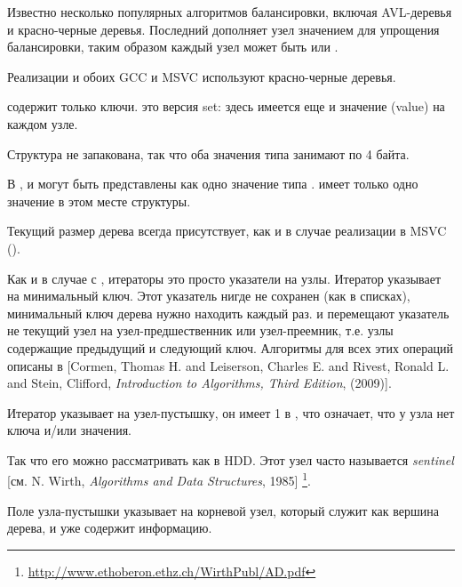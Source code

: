 Известно несколько популярных алгоритмов балансировки, включая AVL-деревья и красно-черные деревья.
Последний дополняет узел значением  для упрощения балансировки, таким образом каждый узел может быть
 или .

Реализации  и  обоих GCC и MSVC используют красно-черные деревья.

 содержит только ключи.
 это  версия set: здесь имеется еще и значение (value) на каждом узле.






Структура не запакована, так что оба значения типа \Tchar занимают по 4 байта.

В ,  и  могут быть представлены как одно значение типа .
 имеет только одно значение в этом месте структуры.

Текущий размер дерева всегда присутствует, как и в случае реализации  в MSVC ().

Как и в случае с , итераторы это просто указатели на узлы.
Итератор  указывает на минимальный ключ.
Этот указатель нигде не сохранен (как в списках), минимальный ключ дерева нужно находить каждый раз.
 и  перемещают указатель не текущий узел на узел-предшественник
или узел-преемник, т.е. узлы содержащие предыдущий и следующий ключ.
Алгоритмы для всех этих операций описаны в
[Cormen, Thomas H. and Leiserson, Charles E. and Rivest, Ronald L. and Stein, Clifford,
\emph{Introduction to Algorithms, Third Edition}, (2009)].

Итератор  указывает на узел-пустышку, он имеет 1 в , что означает, что у узла
нет ключа и/или значения.

Так что его можно рассматривать как  в \ac{HDD}.
Этот узел часто называется \emph{sentinel} [см. N. Wirth, \emph{Algorithms and Data Structures}, 1985]
\footnote{\url{http://www.ethoberon.ethz.ch/WirthPubl/AD.pdf}}.

Поле  узла-пустышки указывает на корневой узел, который служит
как вершина дерева, и уже содержит информацию.


